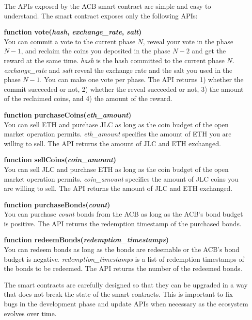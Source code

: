 \documentclass[dvipdfmx,a4paper]{article}
\begin{document}
The APIs exposed by the ACB smart contract are simple and easy to understand. The smart contract exposes only the following APIs:

\begin{description}
\item{\textbf{function vote(\textit{hash}, \textit{exchange\_rate}, \textit{salt})}}\\
You can commit a vote to the current phase $N$, reveal your vote in the phase $N-1$, and reclaim the coins you deposited in the phase $N-2$ and get the reward at the same time. \textit{hash} is the hash committed to the current phase $N$. \textit{exchange\_rate} and \textit{salt} reveal the exchange rate and the salt you used in the phase $N-1$. You can make one vote per phase. The API returns 1) whether the commit succeeded or not, 2) whether the reveal succeeded or not, 3) the amount of the reclaimed coins, and 4) the amount of the reward.
\item{\textbf{function purchaseCoins(\textit{eth\_amount})}}\\
You can sell ETH and purchase JLC as long as the coin budget of the open market operation permits. \textit{eth\_amount} specifies the amount of ETH you are willing to sell. The API returns the amount of JLC and ETH exchanged.
\item{\textbf{function sellCoins(\textit{coin\_amount})}}\\
You can sell JLC and purchase ETH as long as the coin budget of the open market operation permits. \textit{coin\_amount} specifies the amount of JLC coins you are willing to sell. The API returns the amount of JLC and ETH exchanged.
\item{\textbf{function purchaseBonds(\textit{count})}}\\
You can purchase \textit{count} bonds from the ACB as long as the ACB's bond budget is positive. The API returns the redemption timestamp of the purchased bonds.
\item{\textbf{function redeemBonds(\textit{redemption\_timestamps})}}\\
You can redeem bonds as long as the bonds are redeemable or the ACB's bond budget is negative. \textit{redemption\_timestamps} is a list of redemption timestamps of the bonds to be redeemed. The API returns the number of the redeemed bonds.
\end{description}

The smart contracts are carefully designed so that they can be upgraded in a way that does not break the state of the smart contracts. This is important to fix bugs in the development phase and update APIs when necessary as the ecosystem evolves over time.
\end{document}

